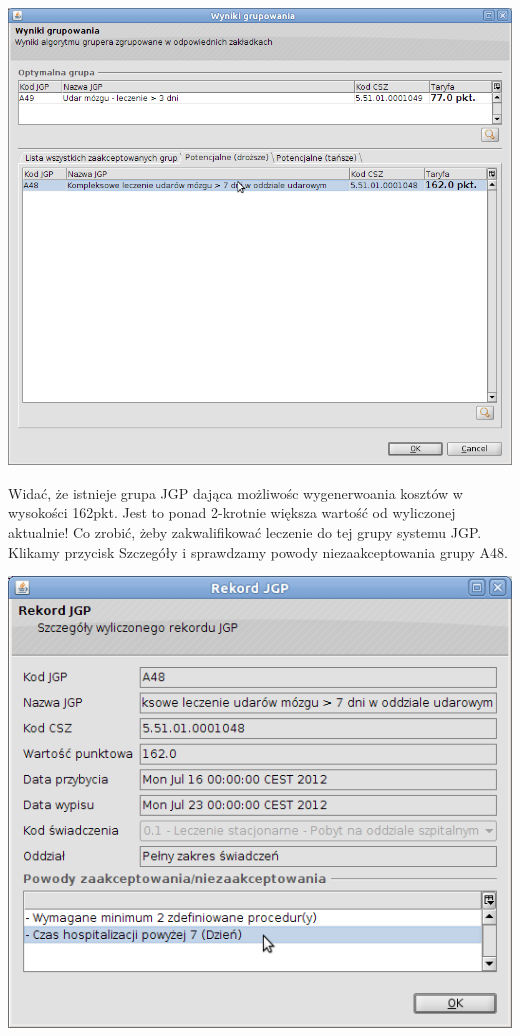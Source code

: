 \includegraphics[scale=0.4]{images/gruper10}

Widać, że istnieje grupa JGP dająca możliwośc wygenerwoania kosztów w wysokości 162pkt. Jest to ponad 2-krotnie większa wartość od wyliczonej aktualnie! Co zrobić, żeby zakwalifikować leczenie do tej grupy systemu JGP. Klikamy przycisk Szczegóły i sprawdzamy powody niezaakceptowania grupy A48.

\includegraphics[scale=0.4]{images/gruper11}

